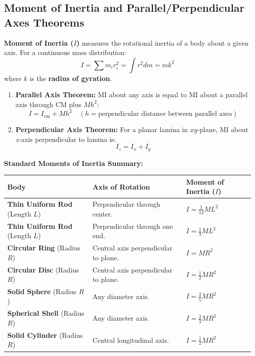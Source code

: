 \documentclass[12pt,a4paper]{article}
\begin{document}
\subsection{Moment of Inertia and Parallel/Perpendicular Axes Theorems}

\begin{tcolorbox}[defbox, title={\textbf{Definition: Moment of Inertia}}]
\textbf{Moment of Inertia ($I$)} measures the rotational inertia of a body about a given axis. For a continuous mass distribution:
\begin{equation}
I = \sum m_i r_i^2 = \int r^2 dm = m k^2
\end{equation}
where $k$ is the \textbf{radius of gyration}.
\end{tcolorbox}

\begin{tcolorbox}[formulabox, title={\textbf{Fundamental Theorems of Moment of Inertia}}]
\begin{enumerate}[leftmargin=*, itemsep=4pt]
  \item \textbf{Parallel Axis Theorem:} MI about any axis is equal to MI about a parallel axis through CM plus $M h^2$:
  \begin{equation}
  I = I_{\text{cm}} + M h^2 \quad (h = \text{perpendicular distance between parallel axes})
  \end{equation}
  \item \textbf{Perpendicular Axis Theorem:} For a planar lamina in $xy$-plane, MI about $z$-axis perpendicular to lamina is:
  \begin{equation}
  I_z = I_x + I_y
  \end{equation}
\end{enumerate}
\end{tcolorbox}

\textbf{Standard Moments of Inertia Summary:}\par\vspace{6pt}\noindent
\begin{tabularx}{\linewidth}{|B{3.2cm}|Y|Y|}
\hline
\textbf{Body} & \textbf{Axis of Rotation} & \textbf{Moment of Inertia ($I$)} \\
\hline
\textbf{Thin Uniform Rod} (Length $L$) & Perpendicular through center. & $I = \frac{1}{12} M L^2$ \\
\hline
\textbf{Thin Uniform Rod} (Length $L$) & Perpendicular through one end. & $I = \frac{1}{3} M L^2$ \\
\hline
\textbf{Circular Ring} (Radius $R$) & Central axis perpendicular to plane. & $I = M R^2$ \\
\hline
\textbf{Circular Disc} (Radius $R$) & Central axis perpendicular to plane. & $I = \frac{1}{2} M R^2$ \\
\hline
\textbf{Solid Sphere} (Radius $R$) & Any diameter axis. & $I = \frac{2}{5} M R^2$ \\
\hline
\textbf{Spherical Shell} (Radius $R$) & Any diameter axis. & $I = \frac{2}{3} M R^2$ \\
\hline
\textbf{Solid Cylinder} (Radius $R$) & Central longitudinal axis. & $I = \frac{1}{2} M R^2$ \\
\hline
\end{tabularx}
\end{document}
